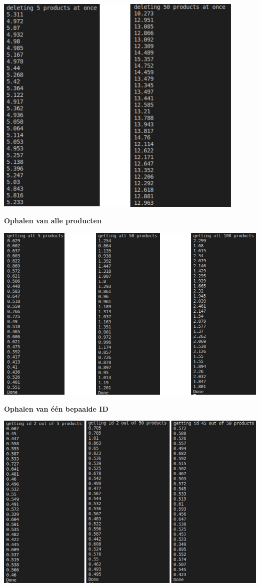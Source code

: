 \begin{center}
	\includegraphics[width=12cm]{img/test-result-3}\\[1cm]
\end{center}
\textbf{Ophalen van alle producten}
\begin{center}
	\includegraphics[width=14cm]{img/test-result-4}\\[1cm]
\end{center}
\textbf{Ophalen van één bepaalde ID}
\begin{center}
	\includegraphics[width=14cm]{img/test-result-5}\\[1cm]
\end{center}

